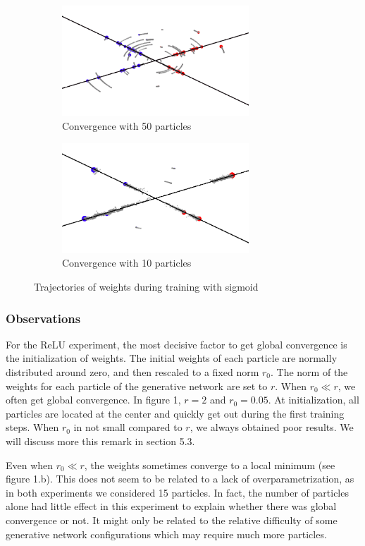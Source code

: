 \documentclass[a4paper, 11pt]{scrartcl}
\begin{document}
{\begin{figure}[h]
\centering
\begin{subfigure}{.5\textwidth}
  \centering
  \includegraphics[width=7cm]{sig50.png}
  \caption{Convergence with 50 particles}
  \label{fig:sub3}
\end{subfigure}%
\begin{subfigure}{.5\textwidth}
  \centering
  \includegraphics[width=7cm]{sig10.png}
  \caption{Convergence with 10 particles}
  \label{fig:sub4}
\end{subfigure}%
  \caption{Trajectories of weights during training with sigmoid}
\end{figure}


\subsubsection*{Observations}

For the ReLU experiment, the most decisive factor to get global convergence is the initialization of weights. The initial weights of each particle are normally distributed around zero, and then rescaled to a fixed norm $r_0$. The norm of the weights for each particle of the generative network are set to $r$. When $r_0 \ll r$, we often get global convergence. In figure 1, $r = 2$ and $r_0 = 0.05$. At initialization, all particles are located at the center and quickly get out during the first training steps. When $r_0$ in not small compared to $r$, we always obtained poor results. We will discuss more this remark in section 5.3.

Even when $r_0 \ll r$, the weights sometimes converge to a local minimum (see figure 1.b). This does not seem to be related to a lack of overparametrization, as in both experiments we considered 15 particles. In fact, the number of particles alone had little effect in this experiment to explain whether there was global convergence or not. It might only be related to the relative difficulty of some generative network configurations which may require much more particles.\\

}
\end{document}
